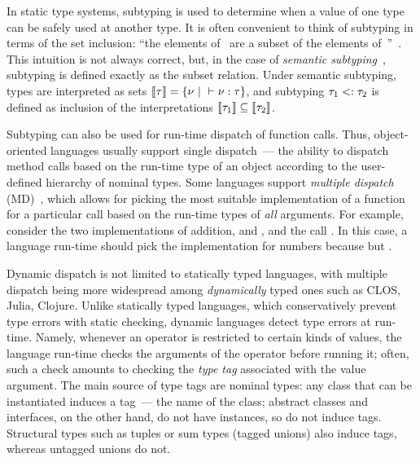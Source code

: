 
In static type systems, subtyping is used to determine
when a value of one type can be safely used at another type.
It is often convenient to think of subtyping 
in terms of the set inclusion: ``the elements of~ are a subset
of the elements of~''~\cite{bib:Pierce:2002:TAPL}.
This intuition is not always correct, but, in the case of
\emph{semantic subtyping}~\cite{bib:Hosoya:2003:XDuce,
	bib:Frisch:2008:sem-sub, bib:Ancona:2016:sem-sub-oo}, 
subtyping is defined exactly as the subset relation. %
Under semantic subtyping, types are interpreted as sets
$\llbracket \tau \rrbracket = \{\nu ~\vert~ \vdash \nu : \tau \}$, 
and subtyping $\tau_1 <: \tau_2$ is defined as inclusion 
of the interpretations
$\llbracket \tau_1 \rrbracket \subseteq \llbracket \tau_2 \rrbracket$.

Subtyping can also be used for run-time dispatch of function calls.
Thus, object-oriented languages
usually support single dispatch~--- the ability to dispatch method calls 
based on the run-time type of an object
according to the user-defined hierarchy of nominal types.
Some languages support \emph{multiple dispatch} 
(MD)~\cite{bib:Chambers:1992:Cecil,bib:Clifton:2000:MultiJava},
which allows for picking the most suitable implementation of a function
for a particular call
based on the run-time types of \emph{all} arguments.
For example, consider the two implementations of addition,
 and ,
and the call .
In this case, a language run-time should pick 
the implementation for numbers 
because  but .

Dynamic dispatch is not limited to statically typed languages,
with multiple dispatch being more widespread among 
\emph{dynamically} typed ones
such as CLOS, Julia, Clojure.
Unlike statically typed languages, 
which conservatively prevent type errors with static checking,
dynamic languages detect type errors at run-time.
Namely, whenever an operator is restricted to certain kinds of values,
the language run-time checks the arguments of the operator before running it;
often, such a check amounts to checking the \emph{type tag} associated 
with the value argument.
The main source of type tags are nominal types:
any class that can be instantiated induces a tag~--- the name of the class; 
abstract classes and interfaces, on the other hand, 
do not have instances, so do not induce tags.
Structural types such as tuples or sum types (tagged unions) also induce tags,
whereas untagged unions do not.

